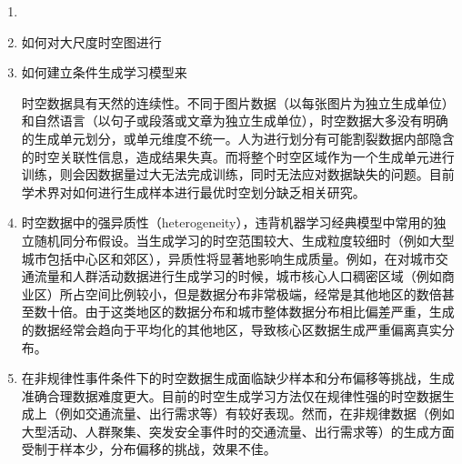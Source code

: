 \documentclass[12pt,UTF8,AutoFakeBold=2,a4paper]{ctexart} %
\begin{document}
\iffalse
\begin{enumerate}
    \item 
    \item 如何对大尺度时空图进行
    \item 如何建立条件生成学习模型来
        
    时空数据具有天然的连续性。不同于图片数据（以每张图片为独立生成单位）和自然语言（以句子或段落或文章为独立生成单位），时空数据大多没有明确的生成单元划分，或单元维度不统一。人为进行划分有可能割裂数据内部隐含的时空关联性信息，造成结果失真。而将整个时空区域作为一个生成单元进行训练，则会因数据量过大无法完成训练，同时无法应对数据缺失的问题。目前学术界对如何进行生成样本进行最优时空划分缺乏相关研究。
    
    \item 时空数据中的强异质性（heterogeneity），违背机器学习经典模型中常用的独立随机同分布假设。当生成学习的时空范围较大、生成粒度较细时（例如大型城市包括中心区和郊区），异质性将显著地影响生成质量。例如，在对城市交通流量和人群活动数据进行生成学习的时候，城市核心人口稠密区域（例如商业区）所占空间比例较小，但是数据分布非常极端，经常是其他地区的数倍甚至数十倍。由于这类地区的数据分布和城市整体数据分布相比偏差严重，生成的数据经常会趋向于平均化的其他地区，导致核心区数据生成严重偏离真实分布。
    
    \item 在非规律性事件条件下的时空数据生成面临缺少样本和分布偏移等挑战，生成准确合理数据难度更大。目前的时空生成学习方法仅在规律性强的时空数据生成上（例如交通流量、出行需求等）有较好表现。然而，在非规律数据（例如大型活动、人群聚集、突发安全事件时的交通流量、出行需求等）的生成方面受制于样本少，分布偏移的挑战，效果不佳。
\end{enumerate}
\end{document}
